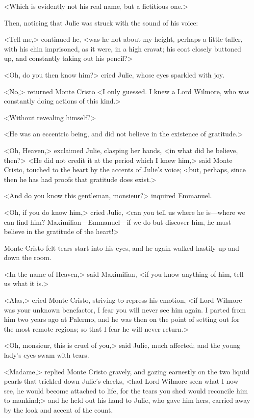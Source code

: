  <Which is evidently not his real name, but a fictitious one.> 

 Then, noticing that Julie was struck with the sound of his voice: 

 <Tell me,> continued he, <was he not about my height, perhaps a little taller, with his chin imprisoned, as it were, in a high cravat; his coat closely buttoned up, and constantly taking out his pencil?> 

 <Oh, do you then know him?> cried Julie, whose eyes sparkled with joy. 

 <No,> returned Monte Cristo <I only guessed. I knew a Lord Wilmore, who was constantly doing actions of this kind.> 

 <Without revealing himself?> 

 <He was an eccentric being, and did not believe in the existence of gratitude.> 

 <Oh, Heaven,> exclaimed Julie, clasping her hands, <in what did he believe, then?>  <He did not credit it at the period which I knew him,> said Monte Cristo, touched to the heart by the accents of Julie's voice; <but, perhaps, since then he has had proofs that gratitude does exist.> 

 <And do you know this gentleman, monsieur?> inquired Emmanuel. 

 <Oh, if you do know him,> cried Julie, <can you tell us where he is—where we can find him? Maximilian—Emmanuel—if we do but discover him, he must believe in the gratitude of the heart!> 

 Monte Cristo felt tears start into his eyes, and he again walked hastily up and down the room. 

 <In the name of Heaven,> said Maximilian, <if you know anything of him, tell us what it is.> 

 <Alas,> cried Monte Cristo, striving to repress his emotion, <if Lord Wilmore was your unknown benefactor, I fear you will never see him again. I parted from him two years ago at Palermo, and he was then on the point of setting out for the most remote regions; so that I fear he will never return.> 

 <Oh, monsieur, this is cruel of you,> said Julie, much affected; and the young lady's eyes swam with tears. 

 <Madame,> replied Monte Cristo gravely, and gazing earnestly on the two liquid pearls that trickled down Julie's cheeks, <had Lord Wilmore seen what I now see, he would become attached to life, for the tears you shed would reconcile him to mankind;> and he held out his hand to Julie, who gave him hers, carried away by the look and accent of the count. 

